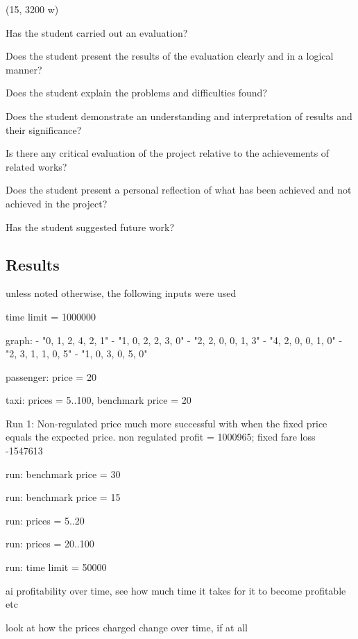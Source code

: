 (15, 3200 w)

Has the student carried out an evaluation?

Does the student present the results of the evaluation clearly and in a logical
manner?

Does the student explain the problems and difficulties found?

Does the student demonstrate an understanding and interpretation of results and
their significance?

Is there any critical evaluation of the project relative to the achievements of
related works?

Does the student present a personal reflection of what has been achieved and
not achieved in the project?

Has the student suggested future work?


\subsection{Results}



unless noted otherwise, the following inputs were used
 
time limit = 1000000

graph:
  - "0, 1, 2, 4, 2, 1"
  - "1, 0, 2, 2, 3, 0"
  - "2, 2, 0, 0, 1, 3"
  - "4, 2, 0, 0, 1, 0"
  - "2, 3, 1, 1, 0, 5"
  - "1, 0, 3, 0, 5, 0"

passenger: price = 20

taxi: prices = 5..100, benchmark price = 20

Run 1: Non-regulated price much more successful with when the fixed price
equals the expected price. non regulated profit = 1000965; fixed fare loss
-1547613


run: benchmark price = 30

run: benchmark price = 15

run: prices = 5..20

run: prices = 20..100

run: time limit = 50000


ai profitability over time, see how much time it takes for it to become
profitable etc

look at how the prices charged change over time, if at all
